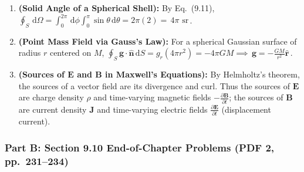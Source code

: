 \documentclass[11pt,a4paper,openany,oneside]{book}
\newcommand{\eqbox}[1]{\boxed{\,#1\,}}
\newcommand{\vect}[1]{\mathbf{#1}}
\newcommand{\uv}[1]{\hat{\mathbf{#1}}}
\newcommand{\dd}{\,\mathrm{d}}
\numberwithin{equation}{chapter}
\begin{document}
\begin{enumerate}[label=\textbf{Ex.\ 9.\arabic*},leftmargin=3.5em]
  \item \textbf{(Solid Angle of a Spherical Shell):} By Eq.\ (9.11), $\oint_S\dd\Omega = \int_0^{2\pi}\dd\phi\int_0^\pi\sin\theta\dd\theta = 2\pi(2) = \eqbox{4\pi\text{ sr}}$.

  \item \textbf{(Point Mass Field via Gauss's Law):} For a spherical Gaussian surface of radius $r$ centered on $M$, $\oint_S\vect{g}\cdot\uv{n}\dd S = g_r(4\pi r^2) = -4\pi GM \implies \eqbox{\vect{g} = -\frac{GM}{r^2}\uv{r}}$.

  \item \textbf{(Sources of $\vect{E}$ and $\vect{B}$ in Maxwell's Equations):} By Helmholtz's theorem, the sources of a vector field are its divergence and curl. Thus the sources of $\vect{E}$ are charge density $\rho$ and time-varying magnetic fields $-\frac{\partial\vect{B}}{\partial t}$; the sources of $\vect{B}$ are current density $\vect{J}$ and time-varying electric fields $\frac{\partial\vect{E}}{\partial t}$ (displacement current).
\end{enumerate}

\subsubsection{Part B: Section 9.10 End-of-Chapter Problems (PDF 2, pp.\ 231--234)}
\end{document}
